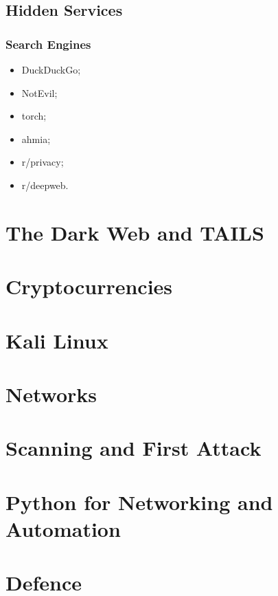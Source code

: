 \documentclass[11pt,a4paper]{report}
\begin{document}
\section{Hidden Services}
\subsection{Search Engines}
\begin{itemize}
    \item DuckDuckGo;
    \item NotEvil;
    \item torch;
    \item ahmia;
    \item r/privacy;
    \item r/deepweb.
\end{itemize}


\chapter{The Dark Web and TAILS}
\chapter{Cryptocurrencies}
\chapter{Kali Linux}
\chapter{Networks}
\chapter{Scanning and First Attack}
\chapter{Python for Networking and Automation}
\chapter{Defence}
\end{document}
